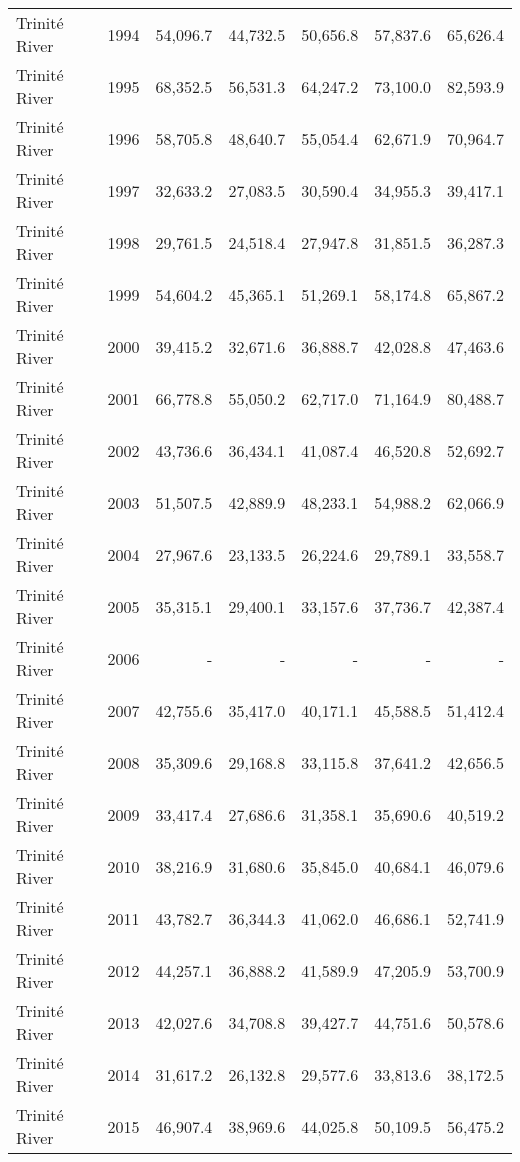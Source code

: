 \begin{longtable}{llrrrrr}
  Trinité River & 1994 & 54,096.7 & 44,732.5 & 50,656.8 & 57,837.6 & 65,626.4 \\ 
  Trinité River & 1995 & 68,352.5 & 56,531.3 & 64,247.2 & 73,100.0 & 82,593.9 \\ 
  Trinité River & 1996 & 58,705.8 & 48,640.7 & 55,054.4 & 62,671.9 & 70,964.7 \\ 
  Trinité River & 1997 & 32,633.2 & 27,083.5 & 30,590.4 & 34,955.3 & 39,417.1 \\ 
  Trinité River & 1998 & 29,761.5 & 24,518.4 & 27,947.8 & 31,851.5 & 36,287.3 \\ 
  Trinité River & 1999 & 54,604.2 & 45,365.1 & 51,269.1 & 58,174.8 & 65,867.2 \\ 
  Trinité River & 2000 & 39,415.2 & 32,671.6 & 36,888.7 & 42,028.8 & 47,463.6 \\ 
  Trinité River & 2001 & 66,778.8 & 55,050.2 & 62,717.0 & 71,164.9 & 80,488.7 \\ 
  Trinité River & 2002 & 43,736.6 & 36,434.1 & 41,087.4 & 46,520.8 & 52,692.7 \\ 
  Trinité River & 2003 & 51,507.5 & 42,889.9 & 48,233.1 & 54,988.2 & 62,066.9 \\ 
  Trinité River & 2004 & 27,967.6 & 23,133.5 & 26,224.6 & 29,789.1 & 33,558.7 \\ 
  Trinité River & 2005 & 35,315.1 & 29,400.1 & 33,157.6 & 37,736.7 & 42,387.4 \\ 
  Trinité River & 2006 & - & - & - & - & - \\ 
  Trinité River & 2007 & 42,755.6 & 35,417.0 & 40,171.1 & 45,588.5 & 51,412.4 \\ 
  Trinité River & 2008 & 35,309.6 & 29,168.8 & 33,115.8 & 37,641.2 & 42,656.5 \\ 
  Trinité River & 2009 & 33,417.4 & 27,686.6 & 31,358.1 & 35,690.6 & 40,519.2 \\ 
  Trinité River & 2010 & 38,216.9 & 31,680.6 & 35,845.0 & 40,684.1 & 46,079.6 \\ 
  Trinité River & 2011 & 43,782.7 & 36,344.3 & 41,062.0 & 46,686.1 & 52,741.9 \\ 
  Trinité River & 2012 & 44,257.1 & 36,888.2 & 41,589.9 & 47,205.9 & 53,700.9 \\ 
  Trinité River & 2013 & 42,027.6 & 34,708.8 & 39,427.7 & 44,751.6 & 50,578.6 \\ 
  Trinité River & 2014 & 31,617.2 & 26,132.8 & 29,577.6 & 33,813.6 & 38,172.5 \\ 
  Trinité River & 2015 & 46,907.4 & 38,969.6 & 44,025.8 & 50,109.5 & 56,475.2 \\ 

\end{longtable}
